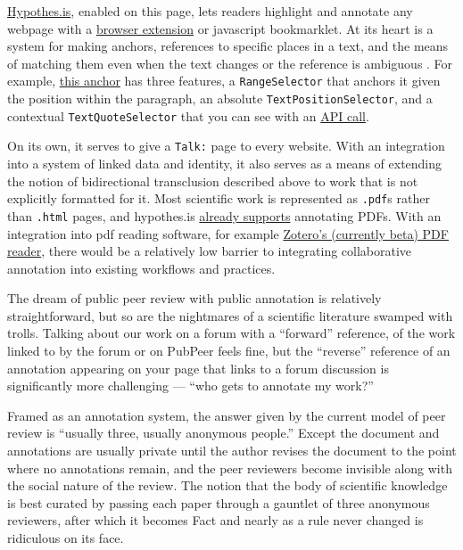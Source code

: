 \documentclass[10pt]{tufte-book}
\begin{document}
\href{https://hypothes.is}{Hypothes.is}, enabled on this page, lets
readers highlight and annotate any webpage with a
\href{https://chrome.google.com/webstore/detail/hypothesis-web-pdf-annota/bjfhmglciegochdpefhhlphglcehbmek}{browser
extension} or javascript bookmarklet. At its heart is a system for
making anchors, references to specific places in a text, and the means
of matching them even when the text changes or the reference is
ambiguous \citep{csillagFuzzyAnchoring2013} . For example,
\href{https://hypothes.is/a/oLw4uk7_Eeyt5N-FVlE3fw}{this anchor} has
three features, a \texttt{RangeSelector} that anchors it given the
position within the paragraph, an absolute
\texttt{TextPositionSelector}, and a contextual
\texttt{TextQuoteSelector} that you can see with an
\href{https://api.hypothes.is/api/annotations/oLw4uk7_Eeyt5N-FVlE3fw}{API
call}.

On its own, it serves to give a \texttt{Talk:} page to every website.
With an integration into a system of linked data and identity, it also
serves as a means of extending the notion of bidirectional transclusion
described above to work that is not explicitly formatted for it. Most
scientific work is represented as \texttt{.pdf}s rather than
\texttt{.html} pages, and hypothes.is
\href{https://web.hypothes.is/help/annotating-locally-saved-pdfs/}{already
supports} annotating PDFs. With an integration into pdf reading
software, for example
\href{https://www.zotero.org/support/pdf_reader_preview}{Zotero's
(currently beta) PDF reader}, there would be a relatively low barrier to
integrating collaborative annotation into existing workflows and
practices.

The dream of public peer review with public annotation is relatively
straightforward, but so are the nightmares of a scientific literature
swamped with trolls. Talking about our work on a forum with a
``forward'' reference, of the work linked to by the forum or on PubPeer
feels fine, but the ``reverse'' reference of an annotation appearing on
your page that links to a forum discussion is significantly more
challenging --- ``who gets to annotate my work?''

Framed as an annotation system, the answer given by the current model of
peer review is ``usually three, usually anonymous people.'' Except the
document and annotations are usually private until the author revises
the document to the point where no annotations remain, and the peer
reviewers become invisible along with the social nature of the review.
The notion that the body of scientific knowledge is best curated by
passing each paper through a gauntlet of three anonymous reviewers,
after which it becomes Fact and nearly as a rule never changed is
ridiculous on its face.
\end{document}
